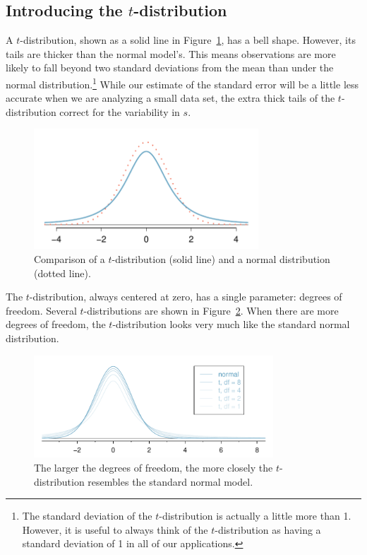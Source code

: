 \subsection{Introducing the $t$-distribution}
\label{introducingTheTDistribution}


A $t$-distribution, shown as a solid line in Figure~\ref{tDistCompareToNormalDist}, has a bell shape. However, its tails are thicker than the normal model's. This means observations are more likely to fall beyond two standard deviations from the mean than under the normal distribution.\footnote{The standard deviation of the $t$-distribution is actually a little more than 1. However, it is useful to always think of the $t$-distribution as having a standard deviation of 1 in all of our applications.} While our estimate of the standard error will be a little less accurate when we are analyzing a small data set, the extra thick tails of the $t$-distribution correct for the variability in $s$. 

\begin{figure}
\centering
\includegraphics[height=45mm]{ch_inference_for_means_oi_biostat/figures/tDistCompareToNormalDist/tDistCompareToNormalDist}
\caption{Comparison of a $t$-distribution (solid line) and a normal distribution (dotted line).}
\label{tDistCompareToNormalDist}
\end{figure}

The $t$-distribution, always centered at zero, has a single parameter: degrees of freedom.  Several $t$-distributions are shown in Figure~\ref{tDistConvergeToNormalDist}. When there are more degrees of freedom, the $t$-distribution looks very much like the standard normal distribution.

\begin{figure}
\centering
\includegraphics[width=0.8\textwidth]{ch_inference_for_means_oi_biostat/figures/tDistConvergeToNormalDist/tDistConvergeToNormalDist}
\caption{The larger the degrees of freedom, the more closely the $t$-distribution resembles the standard normal model.}
\label{tDistConvergeToNormalDist}
\end{figure}

